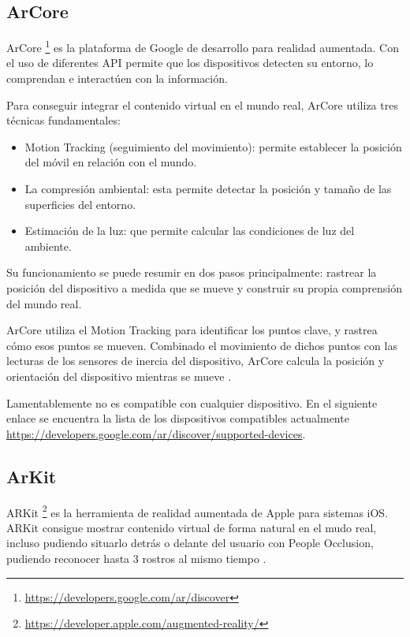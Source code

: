 \subsection{ArCore}

ArCore \footnote{\url{https://developers.google.com/ar/discover}} es la plataforma de Google de desarrollo para realidad aumentada. Con el uso de diferentes API permite que los dispositivos detecten su entorno, lo comprendan e interactúen con la información.

Para conseguir integrar el contenido virtual en el mundo real, ArCore utiliza tres técnicas fundamentales:
\begin{itemize}
	\item Motion Tracking (seguimiento del movimiento): permite establecer la posición del móvil en relación con el mundo.
	\item La compresión ambiental: esta permite detectar la posición y tamaño de las superficies del entorno.
	\item Estimación de la luz: que permite calcular las condiciones de luz del ambiente.
\end{itemize}

Su funcionamiento se puede resumir en dos pasos principalmente: rastrear la posición del dispositivo a medida que se mueve y construir su propia comprensión del mundo real.

ArCore utiliza el Motion Tracking para identificar los puntos clave, y rastrea cómo esos puntos se mueven. Combinado el movimiento de dichos puntos con  las lecturas de los sensores de inercia del dispositivo, ArCore calcula la posición y orientación del dispositivo mientras se mueve \cite{google}.

Lamentablemente no es compatible con cualquier dispositivo. En el siguiente enlace se encuentra la lista de los dispositivos compatibles actualmente \url{https://developers.google.com/ar/discover/supported-devices}.

\subsection{ArKit}

ARKit \footnote{\url{https://developer.apple.com/augmented-reality/}} es la herramienta de realidad aumentada de Apple para sistemas iOS. ARKit consigue mostrar contenido virtual de forma natural en el mudo real, incluso pudiendo situarlo detrás o delante del usuario con People Occlusion, pudiendo reconocer hasta 3 rostros al mismo tiempo \cite{apple_inc}.

